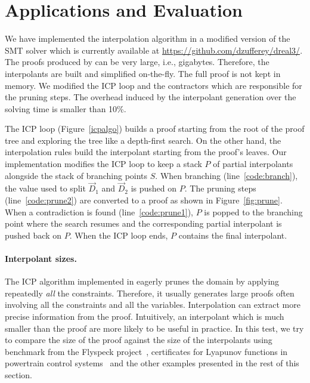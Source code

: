 \section{Applications and Evaluation}
\label{sec:eval}

We have implemented the interpolation algorithm in a modified version of the \dReal SMT solver which is currently available at \url{https://github.com/dzufferey/dreal3/}. %
The proofs produced by \dReal can be very large, i.e., gigabytes.
Therefore, the interpolants are built and simplified on-the-fly.
The full proof is not kept in memory.
We modified the ICP loop and the contractors which are responsible for the pruning steps.
The overhead induced by the interpolant generation over the solving time is smaller than 10\%.

The ICP loop (Figure~\ref{icpalgo}) builds a proof starting from the root of the proof tree and exploring the tree like a depth-first search.
On the other hand, the interpolation rules build the interpolant starting from the proof's leaves.
Our implementation modifies the ICP loop to keep a stack $P$ of partial interpolants alongside the stack of branching points $S$.
When branching (line~\ref{code:branch}), the value used to split $\vec D_1$ and $\vec D_2$ is pushed on $P$.
The pruning steps (line~\ref{code:prune2}) are converted to a proof as shown in Figure~\ref{fig:prune}.
When a contradiction is found (line~\ref{code:prune1}), $P$ is popped to the branching point where the search resumes and the corresponding partial interpolant is pushed back on $P$.
When the ICP loop ends, $P$ contains the final interpolant.

\paragraph{Interpolant sizes.}
The ICP algorithm implemented in \dReal eagerly prunes the domain by applying repeatedly \emph{all} the constraints.
Therefore, it usually generates large proofs often involving all the constraints and all the variables.
Interpolation can extract more precise information from the proof.
Intuitively, an interpolant which is much smaller than the proof are more likely to be useful in practice.
In this test, we try to compare the size of the proof against the size of the interpolants using benchmark from the Flyspeck project~\cite{2015arXiv150102155H}, certificates for Lyapunov functions in powertrain control systems~\cite{DBLP:conf/hybrid/KapinskiDSA14} and the other examples presented in the rest of this section.

